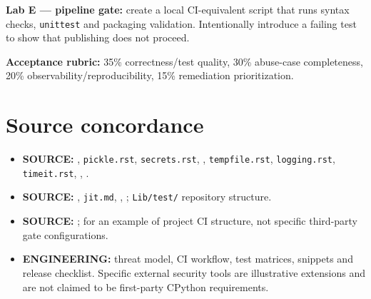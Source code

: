 \documentclass[
  11pt,
]{report}
\newcommand{\passthrough}[1]{#1}
\providecommand{\tightlist}{%
  \setlength{\itemsep}{0pt}\setlength{\parskip}{0pt}}
\begin{document}
\textbf{Lab E --- pipeline gate:} create a local CI-equivalent script
that runs syntax checks, \passthrough{\lstinline!unittest!} and
packaging validation. Intentionally introduce a failing test to show
that publishing does not proceed.

\textbf{Acceptance rubric:} 35\% correctness/test quality, 30\%
abuse-case completeness, 20\% observability/reproducibility, 15\%
remediation prioritization.

\chapter{Source concordance}\label{source-concordance}

\begin{itemize}
\tightlist
\item
  \textbf{SOURCE:}
  ,
  \passthrough{\lstinline!pickle.rst!},
  \passthrough{\lstinline!secrets.rst!},
  ,
  \passthrough{\lstinline!tempfile.rst!},
  \passthrough{\lstinline!logging.rst!},
  \passthrough{\lstinline!timeit.rst!},
  ,
  .
\item
  \textbf{SOURCE:}
  ,
  \passthrough{\lstinline!jit.md!},
  ,
  ;
  \passthrough{\lstinline!Lib/test/!} repository structure.
\item
  \textbf{SOURCE:}
  ;
   for an example of project
  CI structure, not specific third-party gate configurations.
\item
  \textbf{ENGINEERING:} threat model, CI workflow, test matrices,
  snippets and release checklist. Specific external security tools are
  illustrative extensions and are not claimed to be first-party CPython
  requirements.
\end{itemize}
\end{document}
